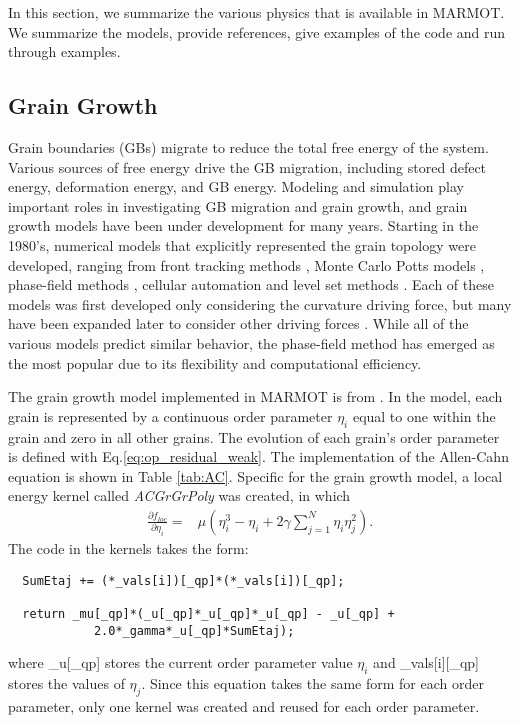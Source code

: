 \documentclass[letter,12pt,fleqn]{article}
\begin{document}
In this section, we summarize the various physics that is available in MARMOT. We summarize the models, provide references, give examples of the code and run through examples.

\subsection{Grain Growth}

Grain boundaries (GBs) migrate to reduce the total free energy of the system. Various sources of free energy drive the GB migration, including stored defect energy, deformation energy, and GB energy. Modeling and simulation play important roles in investigating GB migration and grain growth, and grain growth models have been under development for many years.  Starting in the 1980's, numerical models that explicitly represented the grain topology were developed, ranging from front tracking methods \citep{frost1988, moldovan2002}, Monte Carlo Potts models \citep{anderson1984, srolovitz1984}, phase-field methods \citep{fan1997, kim2006}, cellular automation \citep{lan2006} and level set methods \citep{zhang2008}.  Each of these models was first developed only considering the curvature driving force, but many have been expanded later to consider other driving forces \citep{chen2004, battaile2007, zhang2010, tonks2010, tonks2011}.  While all of the various models predict similar behavior, the phase-field method has emerged as the most popular due to its flexibility and computational efficiency.  


The grain growth model implemented in MARMOT is from \citet{moelans2008}.  In the model, each grain is represented by a continuous order parameter $\eta_i$ equal to one within the grain and zero in all other grains.  The evolution of each grain's order parameter is defined with Eq.\eqref{eq:op_residual_weak}.  The implementation of the Allen-Cahn equation is shown in Table \ref{tab:AC}. Specific for the grain growth model, a local energy kernel called \emph{ACGrGrPoly} was created, in which 
\begin{eqnarray}
    \frac{\partial f_{loc}}{\partial \eta_i} =&  \mu \left( \eta_i^3 - \eta_i  + 2 \gamma \sum_{j=1}^N \eta_i \eta_j^2 \right).
\end{eqnarray}
The code in the kernels takes the form:
\begin{verbatim}
  SumEtaj += (*_vals[i])[_qp]*(*_vals[i])[_qp]; 

  return _mu[_qp]*(_u[_qp]*_u[_qp]*_u[_qp] - _u[_qp] + 
            2.0*_gamma*_u[_qp]*SumEtaj);
\end{verbatim}
where \_u[\_qp] stores the current order parameter value $\eta_i$ and \_vals[i][\_qp] stores the values of $\eta_j$. Since this equation takes the same form for each order parameter, only one kernel was created and reused for each order parameter.  
\end{document}
